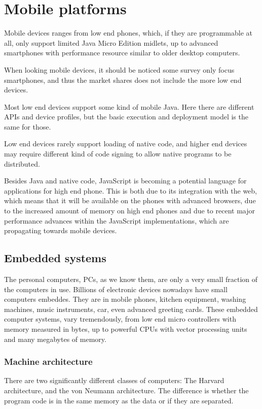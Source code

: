 \documentclass[11pt]{report}
\begin{document}
\section{Mobile platforms}

Mobile devices ranges from low end phones, which, if they are programmable at all, only support limited Java Micro Edition midlets, up to advanced smartphones with performance resource similar to older desktop computers.

When looking mobile devices, it should be noticed some survey \cite{smartphonesurvey} only focus smartphones, and thus the market shares does not include the more low end devices.

Most low end devices support some kind of mobile Java.
Here there are different APIs and device profiles, but the basic execution and deployment model is the same for those.

Low end devices rarely support loading of native code, and higher end devices may require different kind of code signing to allow native programs to be distributed.

Besides Java and native code, JavaScript is becoming a potential language for applications for high end phone. 
This is both due to its integration with the web, which means that it will be available on the phones with advanced browsers, due to the increased amount of memory on high end phones
and due to recent major performance advances within the JavaScript implementations, which are propagating towards mobile devices.

\subsection{Embedded systems}
The personal computers, PCs, as we know them, are only a very small fraction of the computers in use.
Billions of electronic devices nowadays have small computers embeddes. They are in mobile phones, kitchen equipment, washing machines, music instruments, car, even advanced greeting cards. 
These embedded computer systems, vary tremendously, from low end micro controllers with memory measured in bytes, up to powerful CPUs with vector processing units and many megabytes of memory.

\subsubsection{Machine architecture}
There are two significantly different classes of computers: The Harvard architecture, and the von Neumann architecture. The difference is whether the program code is in the same memory as the data or if they are separated.
\end{document}
